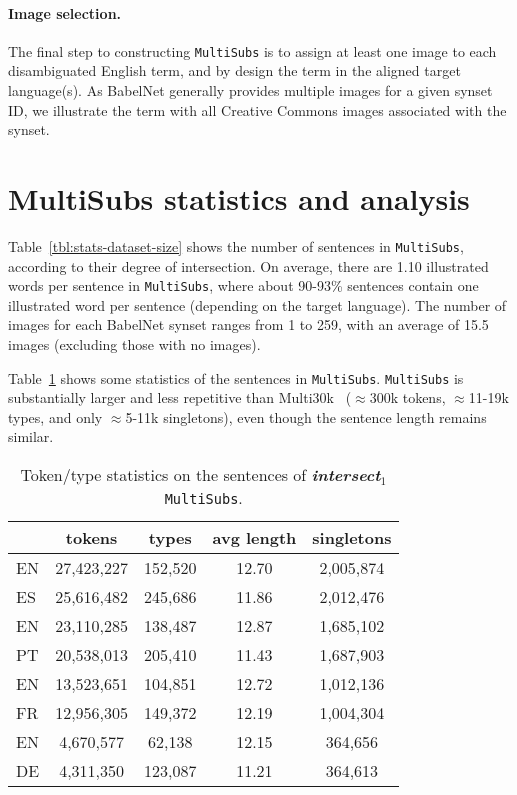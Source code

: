 \documentclass[twocolumn]{svjour3}          \smartqed  \usepackage{graphicx}
\newcommand{\multisubs}{\texttt{MultiSubs}\xspace}
\begin{document}
\paragraph{Image selection.} The final step to constructing \multisubs is to assign at least one image to each disambiguated English term, and by design the term in the aligned target language(s). As BabelNet generally provides multiple images for a given synset ID, we illustrate the term with all Creative Commons images associated with the synset.

\section{MultiSubs statistics and analysis}
\label{sec:statistics}

Table~\ref{tbl:stats-dataset-size} shows the number of sentences in \multisubs, according to their degree of intersection. On average, there are 1.10 illustrated words per sentence in \multisubs, where about 90-93\% sentences contain one illustrated word per sentence (depending on the target language). The number of images for each BabelNet synset ranges from 1 to 259, with an average of 15.5 images (excluding those with no images). 

Table~\ref{tbl:tokentype} shows some statistics of the sentences in \multisubs. \multisubs is substantially larger and less repetitive than Multi30k~\cite{ElliottEtAl:2016} ($\approx$300k tokens, $\approx$11-19k types, and only $\approx$5-11k singletons), even though the sentence length remains similar.



\begin{table}
\caption{Token/type statistics on the sentences of \textbf{\textit{intersect$_1$}} \multisubs.}
\label{tbl:tokentype}
\small
\centering
\begin{tabular}{lcccc}
\toprule
& \textbf{tokens} & \textbf{types} & \textbf{avg length} & {\bf singletons} \\
\midrule
EN & 27,423,227 & 152,520 & 12.70 & 2,005,874\\
ES & 25,616,482 & 245,686 & 11.86 & 2,012,476\\
\midrule
EN & 23,110,285 & 138,487 & 12.87 & 1,685,102\\
PT & 20,538,013 & 205,410 & 11.43 & 1,687,903\\
\midrule
EN & 13,523,651 & 104,851 & 12.72 & 1,012,136\\
FR & 12,956,305 & 149,372 & 12.19 & 1,004,304\\
\midrule
EN & 4,670,577 & 62,138 & 12.15 & 364,656\\
DE & 4,311,350 & 123,087 & 11.21 & 364,613\\
\bottomrule
\end{tabular}
\end{table}
\end{document}
